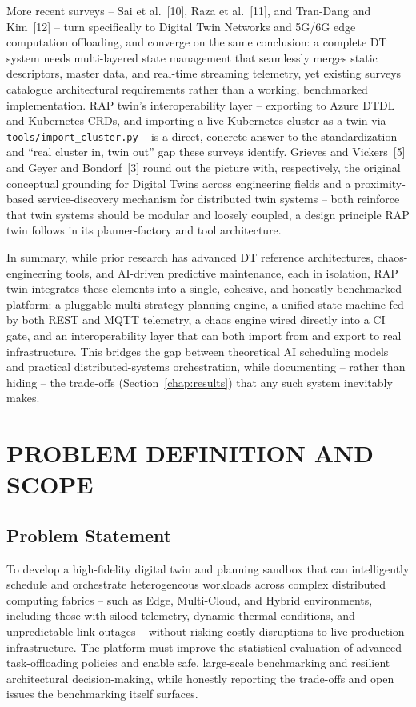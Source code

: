 \documentclass[12pt,a4]{report}
\begin{document}
More recent surveys -- Sai et al.~[10], Raza et al.~[11], and Tran-Dang and Kim~[12] -- turn specifically to Digital Twin Networks and 5G/6G edge computation offloading, and converge on the same conclusion: a complete DT system needs multi-layered state management that seamlessly merges static descriptors, master data, and real-time streaming telemetry, yet existing surveys catalogue architectural requirements rather than a working, benchmarked implementation. RAP twin's interoperability layer -- exporting to Azure DTDL and Kubernetes CRDs, and importing a live Kubernetes cluster as a twin via \texttt{tools/import\_cluster.py} -- is a direct, concrete answer to the standardization and ``real cluster in, twin out'' gap these surveys identify. Grieves and Vickers~[5] and Geyer and Bondorf~[3] round out the picture with, respectively, the original conceptual grounding for Digital Twins across engineering fields and a proximity-based service-discovery mechanism for distributed twin systems -- both reinforce that twin systems should be modular and loosely coupled, a design principle RAP twin follows in its planner-factory and tool architecture.

In summary, while prior research has advanced DT reference architectures, chaos-engineering tools, and AI-driven predictive maintenance, each in isolation, RAP twin integrates these elements into a single, cohesive, and honestly-benchmarked platform: a pluggable multi-strategy planning engine, a unified state machine fed by both REST and MQTT telemetry, a chaos engine wired directly into a CI gate, and an interoperability layer that can both import from and export to real infrastructure. This bridges the gap between theoretical AI scheduling models and practical distributed-systems orchestration, while documenting -- rather than hiding -- the trade-offs (Section~\ref{chap:results}) that any such system inevitably makes.


\chapter{PROBLEM DEFINITION \vspace*{0.5\baselineskip} AND SCOPE}
\section{Problem Statement}

To develop a high-fidelity digital twin and planning sandbox that can intelligently schedule and orchestrate heterogeneous workloads across complex distributed computing fabrics -- such as Edge, Multi-Cloud, and Hybrid environments, including those with siloed telemetry, dynamic thermal conditions, and unpredictable link outages -- without risking costly disruptions to live production infrastructure. The platform must improve the statistical evaluation of advanced task-offloading policies and enable safe, large-scale benchmarking and resilient architectural decision-making, while honestly reporting the trade-offs and open issues the benchmarking itself surfaces.
\end{document}
